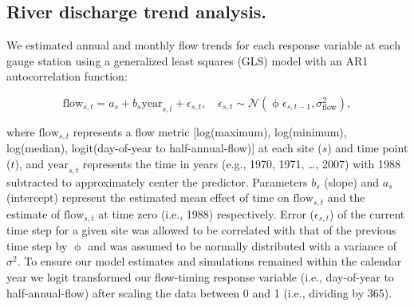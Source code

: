 \documentclass[9pt,twocolumn,twoside,lineno]{pnas-new}
\begin{document}
{\subsection{River discharge trend analysis.} We estimated annual and monthly flow trends for each response variable at each gauge station using a generalized least squares (GLS) model with an AR1 autocorrelation function:
\begin{linenomath*}
\begin{equation}
  \mathrm{flow}_{s,t} = a_s + b_s \mathrm{year}_{s,t} + \epsilon_{s,t}, \quad 
  \epsilon_{s,t} \sim \mathcal{N}(\upphi \epsilon_{s,t-1}, \sigma_\mathrm{flow}^2) \label{eq1},
\end{equation}
\end{linenomath*}
where $\mathrm{flow}_{s,t}$ represents a flow metric [log(maximum), log(minimum), log(median), logit(day-of-year to half-annual-flow)] at each site ($s$) and time point ($t$),  and $\mathrm{year}_{s,t}$ represents the time in years (e.g., 1970, 1971, \ldots, 2007) with 1988 subtracted to approximately center the predictor. Parameters $b_{s}$ (slope) and $a_{s}$ (intercept) represent the estimated mean effect of time on $\mathrm{flow}_{s,t}$ and the estimate of $\mathrm{flow}_{s,t}$ at time zero (i.e., 1988) respectively. Error ($\epsilon_{s,t}$) of the current time step for a given site was allowed to be correlated with that of the previous time step by $\upphi$ and was assumed to be normally distributed with a variance of $\sigma^{2}$. To ensure our model estimates and simulations remained within the calendar year we logit transformed our flow-timing response variable (i.e., day-of-year to half-annual-flow) after scaling the data between 0 and 1 (i.e., dividing by 365).

}
\end{document}
